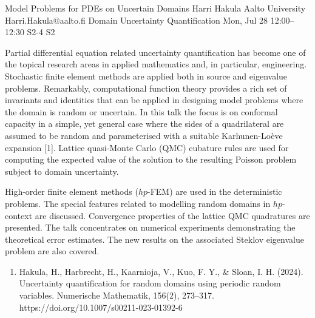 \begin{talk}
  {Model Problems for PDEs on Uncertain Domains}%
  {Harri Hakula}%
  {Aalto University}%
  {Harri.Hakula@aalto.fi}%
  {Domain Uncertainty Quantification}%
  {}%
  {Mon, Jul 28 12:00--12:30}%
  {S2-4}%
  {S2}%
    
   
Partial differential equation related uncertainty quantification has become one of the
topical research areas in applied mathematics and, in particular, engineering.
Stochastic finite element methods are applied both in source and eigenvalue problems.
Remarkably, computational function theory provides a rich set of invariants 
and identities that
can be applied in designing model problems where the domain is random or uncertain. 
In this talk the focus is on conformal capacity in a simple, 
yet general case where the sides of a quadrilateral are assumed to be random 
and parameterised with a suitable Karhunen-Lo\`eve expansion [1].
Lattice quasi-Monte Carlo (QMC) cubature rules are used for computing the expected value of the solution to the resulting Poisson problem subject to domain uncertainty. 

High-order finite element methods ($hp$-FEM) are used in the deterministic problems.
The special features related to modelling random domains in $hp$-context are discussed.
Convergence properties of the lattice QMC quadratures are presented. The talk
concentrates on numerical experiments demonstrating the theoretical error estimates.
The new results on the associated Steklov eigenvalue problem are also covered.


\medskip

\begin{enumerate}
 \item[{[1]}] Hakula, H., Harbrecht, H., Kaarnioja, V., Kuo, F. Y., \& Sloan, I. H. (2024). Uncertainty quantification for random domains using periodic random variables. Numerische Mathematik, 156(2), 273--317. https://doi.org/10.1007/s00211-023-01392-6
\end{enumerate}

\end{talk}

